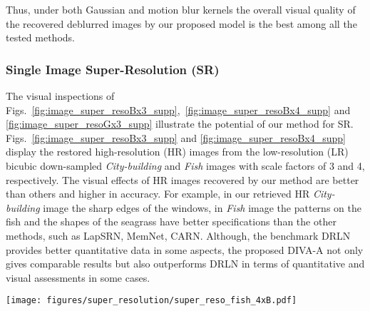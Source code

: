 \documentclass[10pt,journal,compsoc]{IEEEtran}
\begin{document}
Thus, under both Gaussian and motion blur kernels the overall visual quality of the recovered deblurred images by our proposed model is the best among all the tested methods.



\subsubsection{Single Image Super-Resolution (SR)}
\label{sec:result_sr_supp}


The visual inspections of Figs.~\ref{fig:image_super_resoBx3_supp},~\ref{fig:image_super_resoBx4_supp} and \ref{fig:image_super_resoGx3_supp} illustrate the potential of our method for SR. Figs.~\ref{fig:image_super_resoBx3_supp} and \ref{fig:image_super_resoBx4_supp} display the restored high-resolution (HR) images from the low-resolution (LR) bicubic down-sampled \textit{City-building} and \textit{Fish} images with scale factors of 3 and 4, respectively. The visual effects of HR images recovered by our method are better than others and higher in accuracy. For example, in our retrieved HR \textit{City-building} image the sharp edges of the windows, in \textit{Fish} image the patterns on the fish and the shapes of the seagrass have better specifications than the other methods, such as LapSRN\cite{Lai2017deep}, MemNet\cite{Tai2017MemNet}, CARN\cite{Ahn2018fast}.
Although, the benchmark DRLN \cite{Anwar2022densely} provides better quantitative data in some aspects, the proposed DIVA-A not only gives comparable results but also outperforms DRLN \cite{Anwar2022densely} in terms of quantitative and visual assessments in some cases.












\begin{figure*}[t!]
\begin{centering}
\texttt{[image: figures/super\_resolution/super\_reso\_fish\_4xB.pdf]}
\end{centering}

\caption{The restored HR \textit{Fish} images from LR images generated by bicubic downsampling with scaling factor 4.}
\label{fig:image_super_resoBx4_supp}

\end{figure*}
\end{document}
